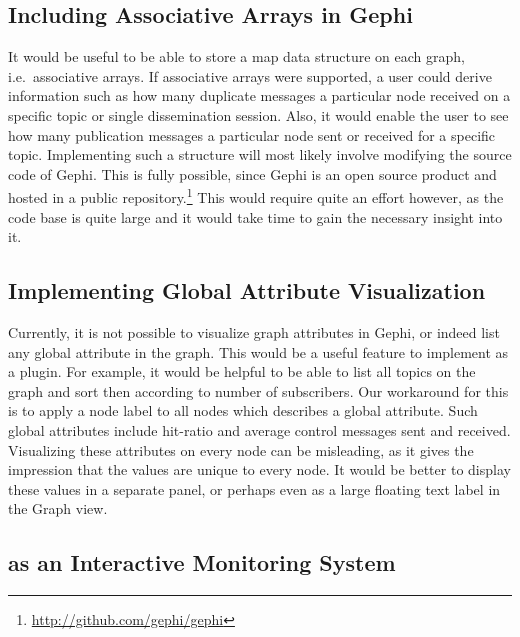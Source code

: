 \subsection{Including Associative Arrays in Gephi}

It would be useful to be able to store a map data structure on each
graph, i.e.\ associative arrays. If associative arrays were supported,
a user could derive information such as how many duplicate messages a
particular node received on a specific topic or single dissemination
session. Also, it would enable the user to see how many publication messages a
particular node sent or received for a specific topic. Implementing such
a structure will most likely involve modifying the source code of Gephi.
This is fully possible, since Gephi is an open source product and hosted
in a public repository.\footnote{\url{http://github.com/gephi/gephi}}
This would require quite an effort however, as the code base is quite
large and it would take time to gain the necessary insight into it.

\subsection{Implementing Global Attribute Visualization}

Currently, it is not possible to visualize graph attributes in Gephi, or
indeed list any global attribute in the graph. This would be a useful
feature to implement as a plugin. For example, it would be helpful to be
able to list all topics on the graph and sort then according to number
of subscribers. Our workaround for this is to apply a node label to all
nodes which describes a global attribute. Such global attributes include
hit-ratio and average control messages sent and received. Visualizing
these attributes on every node can be misleading, as it gives the
impression that the values are unique to every node. It would be better
to display these values in a separate panel, or perhaps even as a large
floating text label in the Graph view.

\subsection{\demo{} as an Interactive Monitoring System}

